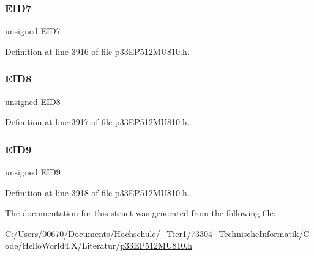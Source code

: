 \subsubsection{\texorpdfstring{E\+I\+D7}{EID7}}
{\footnotesize\ttfamily unsigned E\+I\+D7}



Definition at line 3916 of file p33\+E\+P512\+M\+U810.\+h.

\mbox{\label{structtag_c1_r_x_f3_e_i_d_b_i_t_s_acca25e0b7d86eb499d01f85222baea87}} 
\subsubsection{\texorpdfstring{E\+I\+D8}{EID8}}
{\footnotesize\ttfamily unsigned E\+I\+D8}



Definition at line 3917 of file p33\+E\+P512\+M\+U810.\+h.

\mbox{\label{structtag_c1_r_x_f3_e_i_d_b_i_t_s_ac6748f73d4ada8538b06548be4f396c2}} 
\subsubsection{\texorpdfstring{E\+I\+D9}{EID9}}
{\footnotesize\ttfamily unsigned E\+I\+D9}



Definition at line 3918 of file p33\+E\+P512\+M\+U810.\+h.



The documentation for this struct was generated from the following file\+:\begin{DoxyCompactItemize}
\item 
C\+:/\+Users/00670/\+Documents/\+Hochschule/\+\_\+\+Tier1/73304\+\_\+\+Technische\+Informatik/\+Code/\+Hello\+World4.\+X/\+Literatur/\hyperlink{p33_e_p512_m_u810_8h}{p33\+E\+P512\+M\+U810.\+h}\end{DoxyCompactItemize}
